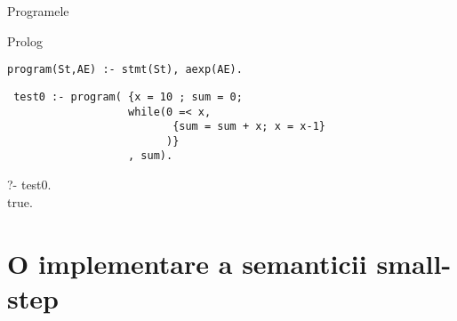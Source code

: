 \documentclass[xcolor=x11names,compress,10pt]{beamer}
\begin{document}
\begin{frame}[fragile]{Programele}

 \vspace{-5ex}\begin{syntaxBlock}{\AExp}
  \alert{
  \begin{itemize}
  \item[]\renewcommand{\syntaxKeyword}{}
  \item[]\renewcommand{\defSort}{\Pgm}
  \syntax{ \terminal{\{}\Block\terminal{\}}\terminal{,}\AExp}{}
  \end{itemize}}
  \end{syntaxBlock}
  
\begin{block}{Prolog}
\begin{verbatim}
program(St,AE) :- stmt(St), aexp(AE).
\end{verbatim}
\end{block}

\begin{example}
\begin{verbatim}
 test0 :- program( {x = 10 ; sum = 0; 
                   while(0 =< x, 
                          {sum = sum + x; x = x-1}
                         )}
                   , sum).
\end{verbatim}  
                  
?- test0.\\
true.                  

\end{example}

\end{frame}

\section{O implementare a semanticii small-step} \sectionframe
\end{document}
